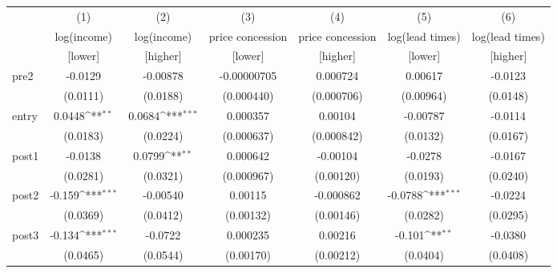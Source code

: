 {
\def\sym#1{\ifmmode^{#1}\else\(^{#1}\)\fi}
\begin{tabular}{l*{6}{c}}
\toprule
            &\multicolumn{1}{c}{(1)}&\multicolumn{1}{c}{(2)}&\multicolumn{1}{c}{(3)}&\multicolumn{1}{c}{(4)}&\multicolumn{1}{c}{(5)}&\multicolumn{1}{c}{(6)}\\
            &\multicolumn{1}{c}{log(income)}&\multicolumn{1}{c}{log(income)}&\multicolumn{1}{c}{price concession}&\multicolumn{1}{c}{price concession}&\multicolumn{1}{c}{log(lead times)}&\multicolumn{1}{c}{log(lead times)}\\
            &\multicolumn{1}{c}{[lower]}&\multicolumn{1}{c}{[higher]}&\multicolumn{1}{c}{[lower]}&\multicolumn{1}{c}{[higher]}&\multicolumn{1}{c}{[lower]}&\multicolumn{1}{c}{[higher]}\\
\midrule
pre2        &     -0.0129         &    -0.00878         & -0.00000705         &    0.000724         &     0.00617         &     -0.0123         \\
            &    (0.0111)         &    (0.0188)         &  (0.000440)         &  (0.000706)         &   (0.00964)         &    (0.0148)         \\
\addlinespace
entry       &      0.0448\sym{**} &      0.0684\sym{***}&    0.000357         &     0.00104         &    -0.00787         &     -0.0114         \\
            &    (0.0183)         &    (0.0224)         &  (0.000637)         &  (0.000842)         &    (0.0132)         &    (0.0167)         \\
\addlinespace
post1       &     -0.0138         &      0.0799\sym{**} &    0.000642         &    -0.00104         &     -0.0278         &     -0.0167         \\
            &    (0.0281)         &    (0.0321)         &  (0.000967)         &   (0.00120)         &    (0.0193)         &    (0.0240)         \\
\addlinespace
post2       &      -0.159\sym{***}&    -0.00540         &     0.00115         &   -0.000862         &     -0.0788\sym{***}&     -0.0224         \\
            &    (0.0369)         &    (0.0412)         &   (0.00132)         &   (0.00146)         &    (0.0282)         &    (0.0295)         \\
\addlinespace
post3       &      -0.134\sym{***}&     -0.0722         &    0.000235         &     0.00216         &      -0.101\sym{**} &     -0.0380         \\
            &    (0.0465)         &    (0.0544)         &   (0.00170)         &   (0.00212)         &    (0.0404)         &    (0.0408)         \\

\end{tabular}}
